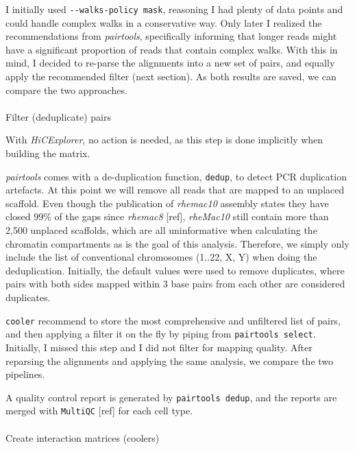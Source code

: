 \documentclass[
  11pt,
  a4paper,
]{scrbook}
\makeatletter
\let\oldparagraph\paragraph
\renewcommand{\paragraph}{
    \@ifstar
      \xxxParagraphStar
      \xxxParagraphNoStar
  }
\newcommand{\xxxParagraphStar}[1]{\oldparagraph*{#1}\mbox{}}
\newcommand{\xxxParagraphNoStar}[1]{\oldparagraph{#1}\mbox{}}
\let\oldemph\emph
\renewcommand\emph[1]{\oldemph{\color{gray}#1}}
\makeatother
\begin{document}
\normalsize

I initially used \texttt{-\/-walks-policy\ mask}, reasoning I had plenty
of data points and could handle complex walks in a conservative way.
Only later I realized the recommendations from \emph{pairtools},
specifically informing that longer reads might have a significant
proportion of reads that contain complex walks. With this in mind, I
decided to re-parse the alignments into a new set of pairs, and equally
apply the recommended filter (next section). As both results are saved,
we can compare the two approaches.

\paragraph{Filter (deduplicate) pairs}\label{filter-deduplicate-pairs}

With \emph{HiCExplorer}, no action is needed, as this step is done
implicitly when building the matrix.

\emph{pairtools} comes with a de-duplication function, \texttt{dedup},
to detect PCR duplication artefacts. At this point we will remove all
reads that are mapped to an unplaced scaffold. Even though the
publication of \emph{rhemac10} assembly states they have closed 99\% of
the gaps since \emph{rhemac8} {[}ref{]}, \emph{rheMac10} still contain
more than 2,500 unplaced scaffolds, which are all uninformative when
calculating the chromatin compartments as is the goal of this analysis.
Therefore, we simply only include the list of conventional chromosomes
(1..22, X, Y) when doing the deduplication. Initially, the default
values were used to remove duplicates, where pairs with both sides
mapped within 3 base pairs from each other are considered duplicates.

\texttt{cooler} recommend to store the most comprehensive and unfiltered
list of pairs, and then applying a filter it on the fly by piping from
\texttt{pairtools\ select}. Initially, I missed this step and I did not
filter for mapping quality. After reparsing the alignments and applying
the same analysis, we compare the two pipelines.

A quality control report is generated by \texttt{pairtools\ dedup}, and
the reports are merged with \texttt{MultiQC} {[}ref{]} for each cell
type.

\paragraph{Create interaction matrices
(coolers)}\label{create-interaction-matrices-coolers}
\end{document}
